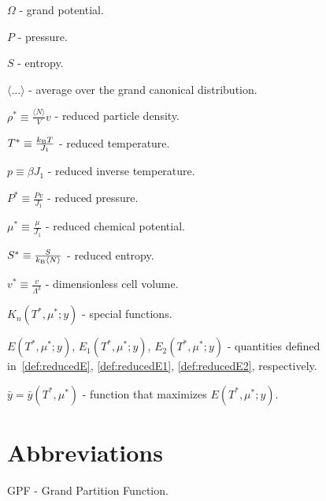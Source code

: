 $\Omega$ - grand potential.

$P$ - pressure.

$S$ - entropy.

$\langle\ldots\rangle$ - average over the grand canonical distribution.

$\rho^* \equiv \frac{\langle N \rangle}{V}v$ - reduced particle density.

$T^* \equiv \frac{k_{\rm B}T}{J_1}$ - reduced temperature.

$p \equiv \beta J_1$ - reduced inverse temperature.

$P^* \equiv \frac{Pv}{J_1}$ - reduced pressure.

$\mu^* \equiv \frac{\mu}{J_1}$ - reduced chemical potential.

$S^* \equiv \frac{S}{k_{\rm B} \langle N \rangle}$ - reduced entropy.

$v^* \equiv \frac{v}{\Lambda^3}$ - dimensionless cell volume.

$K_n(T^*,\mu^*;y)$ - special functions.

$E(T^*,\mu^*;y)$, $E_1(T^*,\mu^*;y)$, $E_2(T^*,\mu^*;y)$ - quantities defined in~\eqref{def:reducedE}, \eqref{def:reducedE1}, \eqref{def:reducedE2}, respectively.

$\bar{y} = \bar{y}(T^*,\mu^*)$ - function that maximizes $E(T^*,\mu^*;y)$.



\section*{Abbreviations}

GPF - Grand Partition Function.